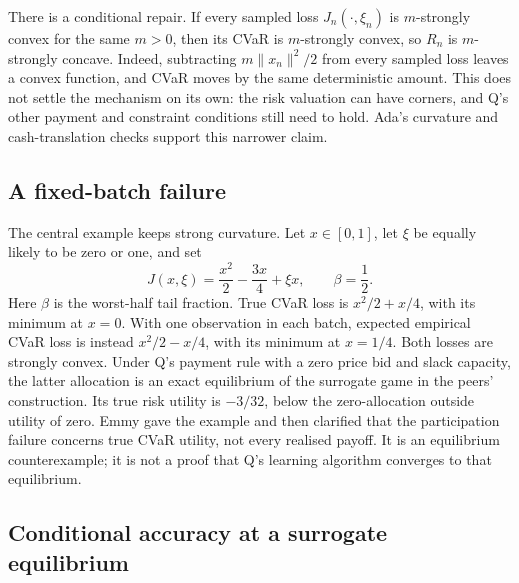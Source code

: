 \documentclass{article}
\begin{document}
There is a conditional repair. If every sampled loss \(J_n(\cdot,\xi_n)\) is \(m\)-strongly convex for the
same \(m>0\), then its CVaR is \(m\)-strongly convex, so \(R_n\) is \(m\)-strongly concave. Indeed,
subtracting \(m\|x_n\|^2/2\) from every sampled loss leaves a convex function, and CVaR moves by the same
deterministic amount. This does not settle the mechanism on its own: the risk valuation can have corners,
and Q's other payment and constraint conditions still need to hold. Ada's curvature and cash-translation
checks support this narrower claim.

\subsection{A fixed-batch failure}

The central example keeps strong curvature. Let \(x\in[0,1]\), let \(\xi\) be equally likely to be zero or one, and set
\[
J(x,\xi)=\frac{x^2}{2}-\frac{3x}{4}+\xi x,
\qquad \beta=\frac12.
\]
Here \(\beta\) is the worst-half tail fraction. True CVaR loss is \(x^2/2+x/4\), with its minimum at
\(x=0\). With one observation in each batch, expected empirical CVaR loss is instead \(x^2/2-x/4\), with its
minimum at \(x=1/4\). Both losses are strongly convex. Under Q's payment rule with a zero price bid and
slack capacity, the latter allocation is an exact equilibrium of the surrogate game in the peers'
construction. Its true risk utility is \(-3/32\), below the zero-allocation outside utility of zero. Emmy
gave the example and then clarified that the participation failure concerns true CVaR utility, not every
realised payoff. It is an equilibrium counterexample; it is not a proof that Q's learning algorithm
converges to that equilibrium.

\subsection{Conditional accuracy at a surrogate equilibrium}
\end{document}
